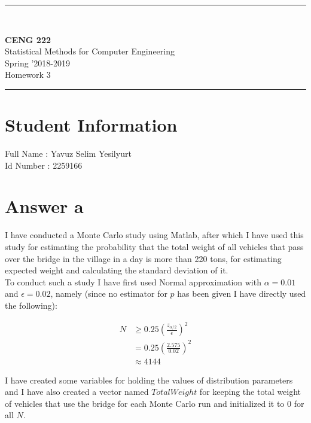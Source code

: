 \documentclass[12pt]{article}
\newcommand{\HRule}{\rule{\linewidth}{1mm}}
\begin{document}
\noindent
\HRule \\[3mm]
\begin{flushright}

                                         \LARGE \textbf{CENG 222}  \\[4mm]
                                         \Large Statistical Methods for Computer Engineering \\[4mm]
                                        \normalsize      Spring '2018-2019 \\
                                           \Large   Homework 3 \\
\end{flushright}
\HRule

\section*{Student Information }
Full Name : Yavuz Selim Yesilyurt \\
Id Number : 2259166 

\section*{Answer a}
I have conducted a Monte Carlo study using Matlab, after which I have used this study for estimating the probability that the total weight of all vehicles that pass over the bridge in the village in a day is more than 220 tons, for estimating expected weight and calculating the standard deviation of it. \\

To conduct such a study I have first used Normal approximation with $\alpha = 0.01$ and $\epsilon = 0.02$, namely (since no estimator for $p$ has been given I have directly used the following):

\begin{align*}
N &\geq 0.25(\frac{z_{\alpha/2}}{\epsilon})^2 \\
  &= 0.25(\frac{2.575}{0.02})^2 \\
  &\approx 4144
\end{align*}

I have created some variables for holding the values of distribution parameters and I have also created a vector named $TotalWeight$ for keeping the total weight of vehicles that use the bridge for each Monte Carlo run and initialized it to 0 for all $N$.\\
\end{document}

